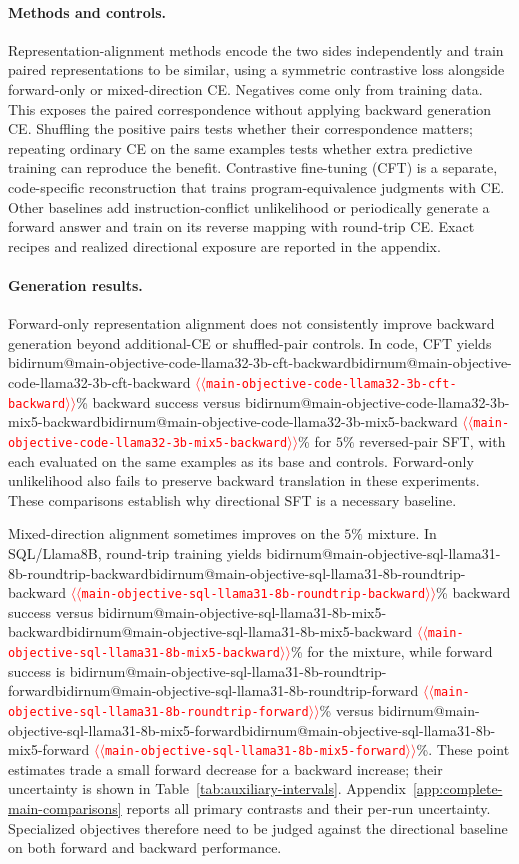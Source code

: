 \documentclass[11pt]{article}
\makeatletter
\providecommand{\NUM}[1]{%
  \ifcsname bidirnum@#1\endcsname\csname bidirnum@#1\endcsname
  \else\textcolor{red}{$\langle\langle$\texttt{#1}$\rangle\rangle$}\fi}
\makeatother
\begin{document}

\paragraph{Methods and controls.}
Representation-alignment methods encode the two sides independently and train paired
representations to be similar, using a symmetric contrastive loss alongside forward-only
or mixed-direction CE. Negatives come only from training data. This exposes the paired
correspondence without applying backward generation CE. Shuffling the positive pairs tests
whether their correspondence matters; repeating ordinary CE on the same examples tests
whether extra predictive training can reproduce the benefit.
Contrastive fine-tuning (CFT) is a separate, code-specific reconstruction that trains
program-equivalence judgments with CE. Other baselines add instruction-conflict
unlikelihood or periodically generate a forward answer and train on its reverse mapping
with round-trip CE. Exact recipes and realized directional exposure are reported in the
appendix.

\paragraph{Generation results.}
Forward-only representation alignment does not consistently improve backward generation
beyond additional-CE or shuffled-pair controls. In code, CFT yields
\NUM{main-objective-code-llama32-3b-cft-backward}\% backward success versus
\NUM{main-objective-code-llama32-3b-mix5-backward}\% for $5\%$ reversed-pair SFT,
with each evaluated on the same examples as its base and controls. Forward-only
unlikelihood also fails to preserve backward translation in these experiments.
These comparisons establish why directional SFT is a necessary baseline.

Mixed-direction alignment sometimes improves on the $5\%$ mixture. In SQL/Llama8B,
round-trip training yields
\NUM{main-objective-sql-llama31-8b-roundtrip-backward}\% backward success versus
\NUM{main-objective-sql-llama31-8b-mix5-backward}\% for the mixture, while forward
success is \NUM{main-objective-sql-llama31-8b-roundtrip-forward}\% versus
\NUM{main-objective-sql-llama31-8b-mix5-forward}\%. These point estimates trade a small
forward decrease for a backward increase; their uncertainty is shown in
Table~\ref{tab:auxiliary-intervals}. Appendix~\ref{app:complete-main-comparisons} reports all primary
contrasts and their per-run uncertainty. Specialized objectives therefore need to be judged
against the directional baseline on both forward and backward performance.
\end{document}
